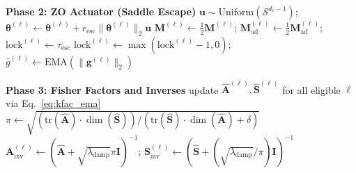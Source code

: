 \documentclass[conference]{IEEEtran}
\begin{document}
\begin{algorithm*}[!t]
\begin{algorithmic}[1]
    \Statex \textbf{Phase 2: ZO Actuator (Saddle Escape)}
            \State $\mathbf{u} \sim \mathrm{Uniform}(\mathcal{S}^{d_\ell - 1})$; $\boldsymbol{\theta}^{(\ell)} \leftarrow \boldsymbol{\theta}^{(\ell)} + r_{\mathrm{esc}} \|\boldsymbol{\theta}^{(\ell)}\|_2 \mathbf{u}$
            \State $\mathbf{M}^{(\ell)} \leftarrow \frac{1}{2}\mathbf{M}^{(\ell)}$; $\mathbf{M}_{\mathrm{ad}}^{(\ell)} \leftarrow \frac{1}{2}\mathbf{M}_{\mathrm{ad}}^{(\ell)}$; $\mathrm{lock}^{(\ell)} \leftarrow \tau_{\mathrm{esc}}$
        \EndIf
    \EndFor
     $\mathrm{lock}^{(\ell)} \leftarrow \max(\mathrm{lock}^{(\ell)} - 1, 0)$; $\bar{g}^{(\ell)} \leftarrow \mathrm{EMA}(\|\mathbf{g}^{(\ell)}\|_2)$ \EndFor

    \Statex \textbf{Phase 3: Fisher Factors and Inverses}
     \State update $\hat{\mathbf{A}}^{(\ell)}, \hat{\mathbf{S}}^{(\ell)}$ for all eligible $\ell$ via Eq.~\eqref{eq:kfac_ema}  \EndIf
            \State $\pi \leftarrow \sqrt{(\mathrm{tr}(\hat{\mathbf{A}}) \cdot \dim(\hat{\mathbf{S}})) / (\mathrm{tr}(\hat{\mathbf{S}}) \cdot \dim(\hat{\mathbf{A}}) + \delta)}$
            \State $\mathbf{A}_{\mathrm{inv}}^{(\ell)} \leftarrow (\hat{\mathbf{A}} + \sqrt{\lambda_{\mathrm{damp}}} \pi \mathbf{I})^{-1}$; $\mathbf{S}_{\mathrm{inv}}^{(\ell)} \leftarrow (\hat{\mathbf{S}} + (\sqrt{\lambda_{\mathrm{damp}}}/\pi) \mathbf{I})^{-1}$
        \EndFor
    \EndIf


\end{algorithmic}
\end{algorithm*}
\end{document}
